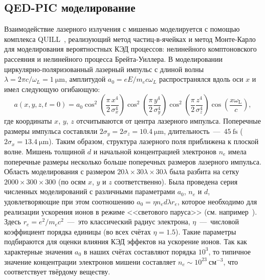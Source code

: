 \subsection{QED-PIC моделирование}
Взаимодействие лазерного излучения с мишенью моделируется с помощью комплекса QUILL~\cite{QUILL}, реализующий метод частиц-в-ячейках и метод Монте-Карло для моделирования вероятностных КЭД процессов: нелинейного комптоновского рассеяния и нелинейного процесса Брейта-Уиллера.
В моделировании циркулярно-поляризованный лазерный импульс с длиной волны $\lambda=2\pi c/\omega_{L}=\SI{1}{\um}$, амплитудой $a_{0}=eE/m_{e}c\omega_{L}$ распространялся вдоль оси $x$ и имел следующую огибающую:
\begin{equation}
    a(x,y,z,t=0) =  a_0 \cos^2 \left( \frac{ \pi }{2}   \frac{x^4}{\sigma_x^4 } \right) \cos^2 \left( \frac{ \pi}{2}   \frac{y^4}{\sigma_y ^4 } \right) \cos^2 \left( \frac{ \pi}{2}   \frac{z^4}{\sigma_z ^4 } \right)\cos \left( \frac {x \omega_\mathrm{L} } {c} \right),
\end{equation}  
где координаты $x$, $y$, $z$ отсчитываются от центра лазерного импульса.
Поперечные размеры импульса составляли $2\sigma_y = 2\sigma_z = \SI{10.4}{\um}$, длительность~---~$\SI{45}{\femto\second}$ ($2 \sigma_x = \SI{13.4}{\um}$).
Таким образом, структура лазерного поля приближена к плоской волне.
Мишень толщиной $d$ и начальной концентрацией электронов $n_e$ имела поперечные размеры несколько больше поперечных размеров лазерного импульса.
Область моделирования с размером $20\lambda\times30\lambda\times30\lambda$ была разбита на сетку $2000\times300\times300$ (по осям $x$, $y$ и $z$ соответственно).
Была проведена серия численных моделирований с различными параметрами $a_{0}$, $n_{e}$ и $d$, удовлетворяющие при этом соотношению $a_{0}=\eta n_{e}d\lambda r_{e}$, которое необходимо для реализации ускорения ионов в режиме <<светового паруса>> (см. например~\cite{macchi2013ion}).
Здесь $r_{e}=e^{2}/m_{e}c^{2}$~---~это классический радиус электрона, $\eta$~---~числовой коэффициент порядка единицы (во всех счётах $\eta=1.5$).
Такие параметры подбираются для оценки влияния КЭД эффектов на ускорение ионов.
Так как характерные значения $a_0$ в наших счётах составляют порядка $10^3$, то типичное значение концентрации электронов мишени составляет $n_e\sim10^{23}\ \text{см}^{-3}$, что соответствует твёрдому веществу.


